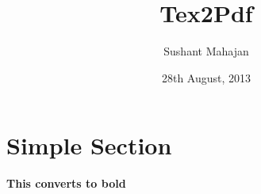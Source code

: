 \documentclass{plain}
\author{Sushant Mahajan}
\date{28th August, 2013}
\title{Tex2Pdf}
\begin{document}
\maketitle
\newpage
\section{Simple Section}
\textbf{This converts to bold}
\end{document}
